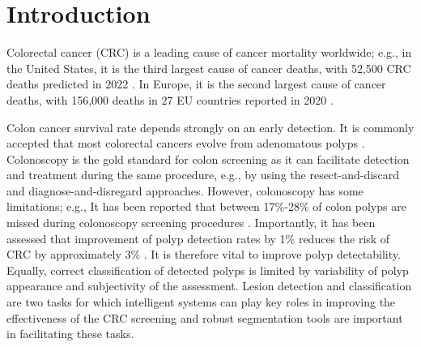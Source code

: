 \documentclass[runningheads]{llncs}
\begin{document}
\section{Introduction}



Colorectal cancer (CRC) is a leading cause of cancer mortality worldwide; e.g., in the United States, it is the third largest cause of cancer deaths, with 52,500 CRC deaths predicted in 2022 \cite{bog1}. In Europe, it is the second largest cause of cancer deaths, with 156,000 deaths in 27 EU countries reported in 2020 \cite{bog2}.

Colon cancer survival rate depends strongly on an early detection. It is commonly accepted that most colorectal cancers evolve from adenomatous polyps \cite{bog3}. Colonoscopy is the gold standard for colon screening as it can facilitate detection and treatment during the same procedure, e.g., by using the resect-and-discard and diagnose-and-disregard approaches. However, colonoscopy has some limitations; e.g., It has been reported that between 17\%-28\% of colon polyps are missed during colonoscopy screening procedures \cite{bog4,bog5}. Importantly, it has been assessed that improvement of polyp detection rates by 1\% reduces the risk of CRC by approximately 3\% \cite{bog6}. It is therefore vital to improve polyp detectability. Equally, correct classification of detected polyps is limited by variability of polyp appearance and subjectivity of the assessment. Lesion detection and classification are two tasks for which intelligent systems can play key roles in improving the effectiveness of the CRC screening and robust segmentation tools are important in facilitating these tasks.
\end{document}
